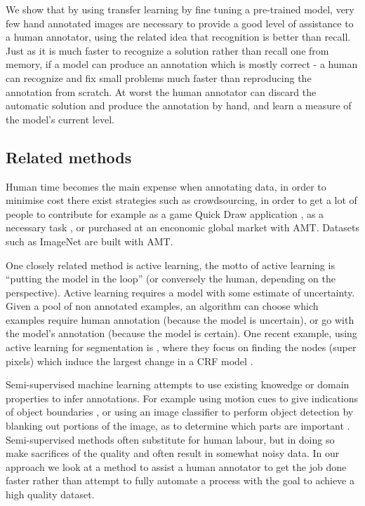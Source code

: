 \documentclass{article}
\begin{document}
We show that by using transfer learning by fine tuning a pre-trained model, very few hand annotated images are necessary to provide a good level of assistance to a human annotator, using the related idea that recognition is better than recall. Just as it is much faster to recognize a solution rather than recall one from memory, if a model can produce an annotation which is mostly correct - a human can recognize and fix small problems much faster than reproducing the annotation from scratch. At worst the human annotator can discard the automatic solution and produce the annotation by hand, and learn a measure of the model's current level.

\subsection{Related methods}



Human time becomes the main expense when annotating data, in order to minimise cost there exist strategies such as crowdsourcing, in order to get a lot of people to contribute for example as a game Quick Draw application \cite{Ha2017}, as a necessary task \cite{Goodfellow2013a}, or purchased at an enconomic global market with \gls{AMT}. Datasets such as ImageNet \cite{Russakovsky2015} are built with \gls{AMT}. 

One closely related method is active learning, the motto of active learning is ``putting the model in the loop'' (or conversely the human, depending on the perspective). Active learning requires a model with some estimate of uncertainty. Given a pool of non annotated examples, an algorithm can choose which examples require human annotation (because the model is uncertain), or go with the model's annotation (because the model is certain). One recent example, using active learning for segmentation is \cite{Xu2017}, where they focus on finding the nodes (super pixels) which induce the largest change in a \gls{CRF} model .

Semi-supervised machine learning attempts to use existing knowedge or domain properties to infer annotations. For example using motion cues to give indications of object boundaries \cite{Hong2017}, or using an image classifier to perform object detection by blanking out portions of the image, as to determine which parts are important \cite{Bazzani2016}. Semi-supervised methods often substitute for human labour, but in doing so make sacrifices of the quality and often result in somewhat noisy data. In our approach we look at a method to assist a human annotator to get the job done faster rather than attempt to fully automate a process with the goal to achieve a high quality dataset. 
\end{document}
